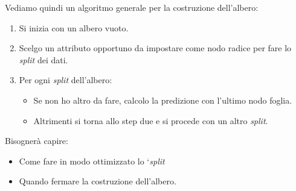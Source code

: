 Vediamo quindi un algoritmo generale per la costruzione dell'albero:
\begin{enumerate}
  \item Si inizia con un albero vuoto.
  \item Scelgo un attributo opportuno da impostare come nodo radice per fare lo \textit{split} dei dati.
  \item Per ogni \textit{split} dell'albero:
  \begin{itemize}
    \item Se non ho altro da fare, calcolo la predizione con l'ultimo nodo foglia.
    \item Altrimenti si torna allo step due e si procede con un altro \textit{split}.
  \end{itemize}
\end{enumerate}
Bisognerà capire:
\begin{itemize}
  \item Come fare in modo ottimizzato lo `\textit{split}
  \item Quando fermare la costruzione dell'albero.
\end{itemize}
